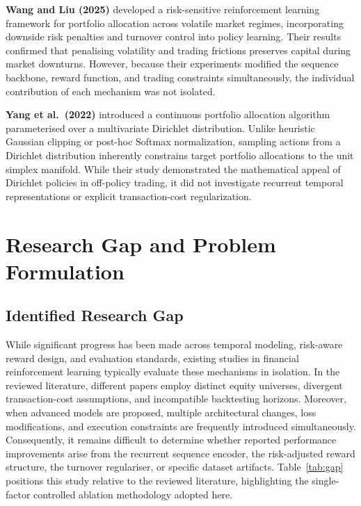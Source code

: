 \documentclass[11pt,a4paper]{article}
\numberwithin{equation}{section}
\numberwithin{table}{section}
\numberwithin{figure}{section}
\numberwithin{algorithm}{section}
\begin{document}
\textbf{Wang and Liu (2025)} \cite{wang2025} developed a risk-sensitive reinforcement learning framework for portfolio allocation across volatile market regimes, incorporating downside risk penalties and turnover control into policy learning. Their results confirmed that penalising volatility and trading frictions preserves capital during market downturns. However, because their experiments modified the sequence backbone, reward function, and trading constraints simultaneously, the individual contribution of each mechanism was not isolated.

\textbf{Yang et al.\ (2022)} \cite{yang2022} introduced a continuous portfolio allocation algorithm parameterised over a multivariate Dirichlet distribution. Unlike heuristic Gaussian clipping or post-hoc Softmax normalization, sampling actions from a Dirichlet distribution inherently constrains target portfolio allocations to the unit simplex manifold. While their study demonstrated the mathematical appeal of Dirichlet policies in off-policy trading, it did not investigate recurrent temporal representations or explicit transaction-cost regularization.

\section{Research Gap and Problem Formulation}\label{ch:gap}
\subsection{Identified Research Gap}
While significant progress has been made across temporal modeling, risk-aware reward design, and evaluation standards, existing studies in financial reinforcement learning typically evaluate these mechanisms in isolation. In the reviewed literature, different papers employ distinct equity universes, divergent transaction-cost assumptions, and incompatible backtesting horizons. Moreover, when advanced models are proposed, multiple architectural changes, loss modifications, and execution constraints are frequently introduced simultaneously. Consequently, it remains difficult to determine whether reported performance improvements arise from the recurrent sequence encoder, the risk-adjusted reward structure, the turnover regulariser, or specific dataset artifacts. Table~\ref{tab:gap} positions this study relative to the reviewed literature, highlighting the single-factor controlled ablation methodology adopted here.
\end{document}
